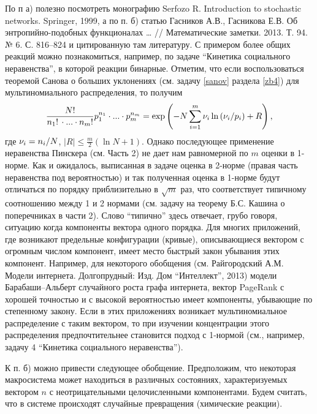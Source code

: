 \begin{remark}
 По п а) полезно посмотреть монографию {Serfozo R.} Introduction to 
stochastic networks. Springer, 1999, а по п. б) статью {Гасников А.В}., {Гасникова Е.В.} Об 
энтропийно-подобных функционалах {\ldots} // Математические заметки. 2013. 
Т. 94. № 6. С. 816--824 и цитированную там литературу. С примером более 
общих реакций можно познакомиться, например, по задаче ``Кинетика 
социального неравенства'', в которой реакции бинарные. Отметим, что если 
воспользоваться теоремой Санова о больших уклонениях (см. задачу \ref{sanov} 
раздела \ref{zb4}) для мультиномиального распределения, то получим
\[
\frac{N!}{n_1 !\,\cdot ...\cdot n_m !}p_1^{n_1 } \cdot ...\cdot p_m^{n_m } 
=\exp \left( {-N\sum\limits_{i=1}^m {\nu _i \ln \left( {{\nu _i } 
\mathord{\left/ {\vphantom {{\nu _i } {p_i }}} \right. 
\kern-\nulldelimiterspace} {p_i }} \right)} +R} \right),
\]
где $\nu _i ={n_i } \mathord{\left/ {\vphantom {{n_i } N}} \right. 
\kern-\nulldelimiterspace} N$, $\left| R \right|\le \frac{m}{2}\left( {\ln 
N+1} \right)$. Однако последующее применение неравенства Пинскера (см. 
Часть 2) не дает нам равномерной по $m$ оценки в 
1-норме. Как и ожидалось, выписанная в задаче оценка в 2-норме (правая часть 
неравенства под вероятностью) и так полученная оценка в 1-норме будут 
отличаться по порядку приблизительно в $\sqrt m $ раз, что соответствует 
типичному соотношению между 1 и 2 нормами (см. задачу на теорему Б.С. Кашина 
о поперечниках в части 2). Слово ``типично'' здесь отвечает, грубо говоря, ситуацию 
когда компоненты вектора одного порядка. Для многих приложений, где 
возникают предельные конфигурации (кривые), описывающиеся вектором с 
огромным числом компонент, имеет место быстрый закон убывания этих 
компонент. Например, для некоторого обобщения (см. Райгородский А.М. Модели интернета. 
Долгопрудный: Изд. Дом ``Интеллект'', 2013) модели Барабаши--Альберт 
случайного роста графа интернета, вектор PageRank с хорошей точностью и с 
высокой вероятностью имеет компоненты, убывающие по степенному закону. Если 
в этих приложениях возникает мультиномиальное распределение с таким 
вектором, то при изучении концентрации этого распределения предпочтительнее 
становится подход с 1-нормой (см., например, задачу 4 ``Кинетика социального 
неравенства'').

К п. б) можно привести следующее обобщение. Предположим, что некоторая 
макросистема может находиться в различных состояниях, характеризуемых 
вектором $n$ с неотрицательными целочисленными компонентами. Будем считать, 
что в системе происходят случайные превращения (химические реакции). 


\end{remark}
